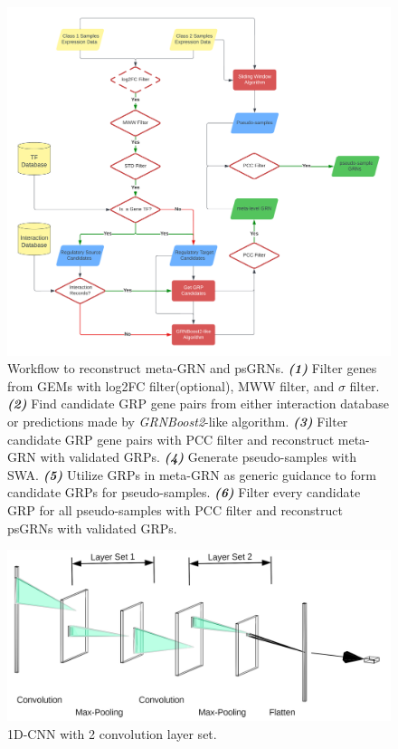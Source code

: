 \documentclass[fleqn,10pt]{wlscirep}
\begin{document}
\begin{figure}[ht]
  \centering
  \includegraphics[width=0.8\linewidth, keepaspectratio,]{../images/data_preprocess_trans.png}
  \caption{
    Workflow to reconstruct meta-GRN and psGRNs.
    \textbf{\emph{(1)}} Filter genes from GEMs with log2FC filter(optional), MWW filter, and $\sigma$ filter.
    \textbf{\emph{(2)}} Find candidate GRP gene pairs from either interaction database or predictions made by \emph{GRNBoost2}\cite{grnboost2}-like algorithm.
    \textbf{\emph{(3)}} Filter candidate GRP gene pairs with PCC filter and reconstruct meta-GRN with validated GRPs.
    \textbf{\emph{(4)}} Generate pseudo-samples with SWA.
    \textbf{\emph{(5)}} Utilize GRPs in meta-GRN as generic guidance to form candidate GRPs for pseudo-samples.
    \textbf{\emph{(6)}} Filter every candidate GRP for all pseudo-samples with PCC filter and reconstruct psGRNs with validated GRPs.
  }
  \label{data_preprocess}
\end{figure}

\begin{figure}[ht]
  \centering
  \includegraphics[width=0.8\linewidth]{../images/nn.png}
  \caption{1D-CNN with 2 convolution layer set.}
  \label{1dCNN}
\end{figure}
\end{document}
